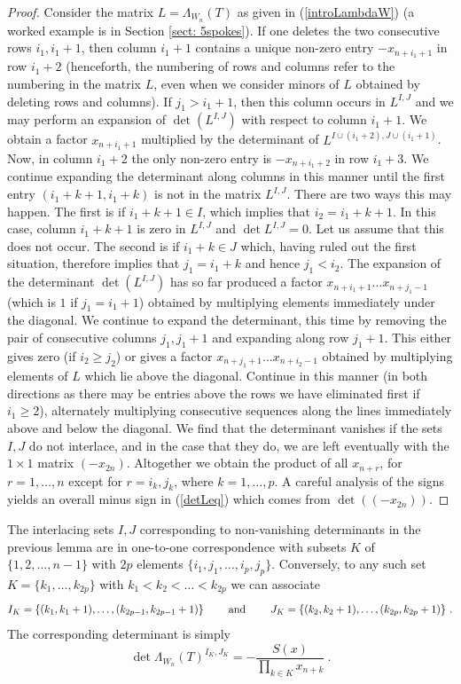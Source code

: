 \documentclass[10pt]{amsart}
\theoremstyle{plain}
\newcommand{\0}{\color{blue}{\mathsf{0}}}
\begin{document}
\begin{proof}
Consider the matrix $L=\Lambda_{W_n}(T)$ as given in  (\ref{introLambdaW}) (a worked example is in Section \ref{sect: 5spokes}). If one deletes the two consecutive rows $i_1,i_1+1$, then  column $i_1+1$  contains a unique  non-zero entry  $-x_{n+i_1+1}$ in row $i_1+2$ (henceforth, the numbering of  rows and columns refer to the numbering in the matrix $L$, even when we consider minors of $L$ obtained by deleting rows and columns). 
If $j_1>i_1+1$, then this column occurs in $L^{I,J}$ and we may perform an  expansion of $\det(L^{I,J})$ with respect to column $i_1+1$. We obtain a factor $x_{n+i_1+1}$ multiplied by the determinant of $L^{I\cup (i_1+2),J\cup (i_1+1)}$. Now,
in column $i_1+2$ the only non-zero entry is $-x_{n+i_1+2}$ in row $i_1+3$. We continue expanding the determinant along columns in this manner until the first entry $(i_1+k+1,i_1+k)$ is not in the matrix $L^{I,J}$.
There are two ways this may happen. The first is if  $i_1+k+1 \in I$, which implies that  $i_2=i_1+k+1$. In this case,  column $i_1+k+1$ is zero in $L^{I,J}$ and $\det L^{I,J}=0$. Let us assume that this does not occur. 
The second is if $i_1+k \in J$ which, having ruled out the first situation, therefore implies that $j_1=i_1+k$ and hence  $j_1<i_2$.   The expansion of the determinant $\det(L^{I,J})$ has so far produced a  factor $x_{n+i_1+1}\ldots x_{n+j_1-1}$ (which is $1$ if $j_1=i_1+1$) obtained by multiplying elements immediately under the diagonal.   We continue to expand the determinant, this time by removing  the pair of consecutive columns $j_1,j_1+1$ and expanding along row $j_1+1$. This either gives zero (if $i_2\geq j_2$) or gives a factor  $x_{n+j_1+1}\ldots x_{n+i_2-1}$ obtained by multiplying elements of $L$ which lie above the diagonal. Continue in this manner (in both directions as there may be entries above the rows we have eliminated first if $i_1\geq2$), alternately multiplying consecutive sequences along the lines immediately above and below the diagonal. We find that the determinant vanishes if the sets $I,J$ do not interlace, and in the case that they do, we are left eventually
with the $1\times1$ matrix $(-x_{2n})$. Altogether we obtain the product of all $x_{n+r}$, for $r=1, \ldots, n$ except for  $r=i_k, j_k$, where $k=1,\ldots,p$. A careful analysis of the signs yields an overall  minus sign in (\ref{detLeq}) which  comes from $\det((-x_{2n}))$.
\end{proof}

The interlacing  sets $I,J$ corresponding to non-vanishing determinants  in the previous lemma are in one-to-one correspondence with subsets $K$ of  $\{1,2,\ldots, n-1 \} $ with $2p$ elements $\{i_1,j_1,\ldots, i_p, j_p\}$.  Conversely, to  any such set  $K = \{k_1,\ldots, k_{2p}\}$ with $k_1<k_2<\ldots< k_{2p}$ we can associate
\[ I_K = \{ (k_1, k_1+1), \ldots, (k_{2p-1}, k_{2p-1}+1)\}   \qquad \hbox{ and } \qquad   J_K = \{ (k_2, k_2+1), \ldots, (k_{2p}, k_{2p}+1)\} \ .  \]
The corresponding determinant is simply 
\begin{equation} \label{detminorforK} \det\Lambda_{W_n}(T)^{I_K,J_K} = -\frac{S(x)}{\prod_{k\in K}x_{n+k} } \ . 
\end{equation}
\end{document}
